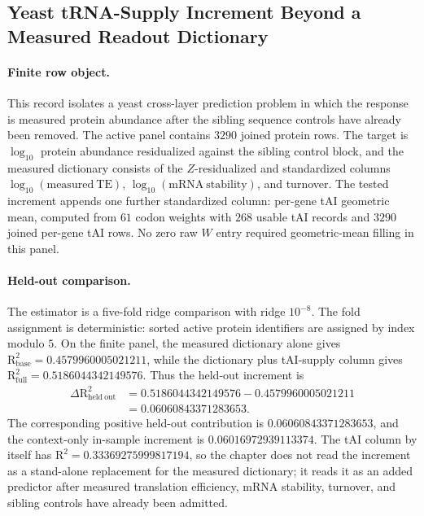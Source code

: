 
\subsection{Yeast tRNA-Supply Increment Beyond a Measured Readout Dictionary}
\label{subsec:bioreality-q6-trna-supply-increment-beyond-measured-dictionary}

\paragraph{Finite row object.}
This record isolates a yeast cross-layer prediction problem in which the response is measured protein abundance after the sibling sequence controls have already been removed.  The active panel contains $3290$ joined protein rows.  The target is $\log_{10}$ protein abundance residualized against the sibling control block, and the measured dictionary consists of the $Z$-residualized and standardized columns $\log_{10}(\mathrm{measured\ TE})$, $\log_{10}(\mathrm{mRNA\ stability})$, and turnover.  The tested increment appends one further standardized column: per-gene tAI geometric mean, computed from $61$ codon weights with $268$ usable tAI records and $3290$ joined per-gene tAI rows.  No zero raw $W$ entry required geometric-mean filling in this panel.

\paragraph{Held-out comparison.}
The estimator is a five-fold ridge comparison with ridge $10^{-8}$.  The fold assignment is deterministic: sorted active protein identifiers are assigned by index modulo $5$.  On the finite panel, the measured dictionary alone gives
$\mathrm{R}^{2}_{\mathrm{base}}=0.4579960005021211$,
while the dictionary plus tAI-supply column gives
$\mathrm{R}^{2}_{\mathrm{full}}=0.5186044342149576$.
Thus the held-out increment is
$$
\begin{aligned}
\Delta \mathrm{R}^{2}_{\mathrm{held\ out}}
  &= 0.5186044342149576 - 0.4579960005021211 \\
  &= 0.06060843371283653 .
\end{aligned}
$$
The corresponding positive held-out contribution is $0.06060843371283653$, and the context-only in-sample increment is $0.06016972939113374$.  The tAI column by itself has $\mathrm{R}^{2}=0.33369275999817194$, so the chapter does not read the increment as a stand-alone replacement for the measured dictionary; it reads it as an added predictor after measured translation efficiency, mRNA stability, turnover, and sibling controls have already been admitted.


